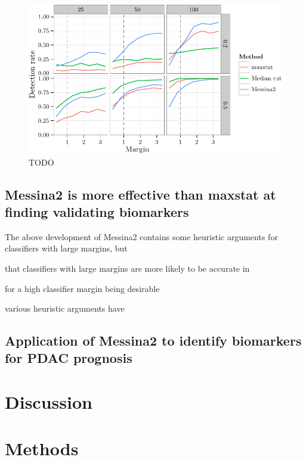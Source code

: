 \documentclass[dissertation.tex]{subfiles}
\begin{document}
\begin{figure}[!htbp]
\centering
\includegraphics[width=\linewidth]{analysis/messina/figure/06-E2B-E2B-plots-1}
\caption[TODO]{TODO}\label{fig:mess-vs-maxstat}
\end{figure}

\subsection{Messina2 is more effective than maxstat at finding validating biomarkers}
The above development of Messina2 contains some heuristic arguments for classifiers with large margins, but 

that classifiers with large margins are more likely to be accurate in 

for a high classifier margin being desirable

various heuristic arguments have 

\subsection{Application of Messina2 to identify biomarkers for \acrshort{PDAC} prognosis}

\section{Discussion}

\section{Methods}
\end{document}
